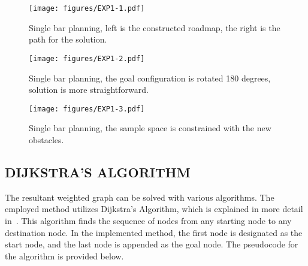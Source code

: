 \documentclass{IEEEtaes}
\begin{document}
\begin{figure*}[b!]
    \begin{center}
        \texttt{[image: figures/EXP1-1.pdf]}
     \end{center}
     \vspace{-1em}
     \caption{Single bar planning, left is the constructed roadmap, the right is the path for the solution.}
     \label{bar-1}
     \vspace{-1em}
\end{figure*}

\begin{figure*}[t]
    \begin{center}
        \texttt{[image: figures/EXP1-2.pdf]}
     \end{center}
     \vspace{-1em}
     \caption{Single bar planning, the goal configuration is rotated 180 degrees, solution is more straightforward.}
     \label{bar-2}
     \vspace{-1em}
\end{figure*}

\begin{figure*}[t]
    \begin{center}
        \texttt{[image: figures/EXP1-3.pdf]}
     \end{center}
     \vspace{-1em}
     \caption{Single bar planning, the sample space is constrained with the new obstacles.}
     \label{bar-3}
     \vspace{-1em}
\end{figure*}

\subsection{\fontsize{10}{13}\selectfont DIJKSTRA'S ALGORITHM}
The resultant weighted graph can be solved with various algorithms. The employed method utilizes Dijkstra's Algorithm, which is explained in more detail in~\cite{dijkstra}. This algorithm finds the sequence of nodes from any starting node to any destination node. In the implemented method, the first node is designated as the start node, and the last node is appended as the goal node. The pseudocode for the algorithm is provided below.

\vspace{-0.5em}
\end{document}

